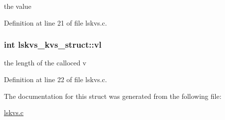 the value 

Definition at line 21 of file lskvs.c.\hypertarget{structlskvs__kvs__struct_aa1c980ae62cdf78d8b358b3a51deda6a}{
\subsubsection[{vl}]{\setlength{\rightskip}{0pt plus 5cm}int {\bf lskvs\_\-kvs\_\-struct::vl}}}
\label{structlskvs__kvs__struct_aa1c980ae62cdf78d8b358b3a51deda6a}


the length of the calloced v 

Definition at line 22 of file lskvs.c.

The documentation for this struct was generated from the following file:\begin{DoxyCompactItemize}
\item 
\hyperlink{lskvs_8c}{lskvs.c}\end{DoxyCompactItemize}
